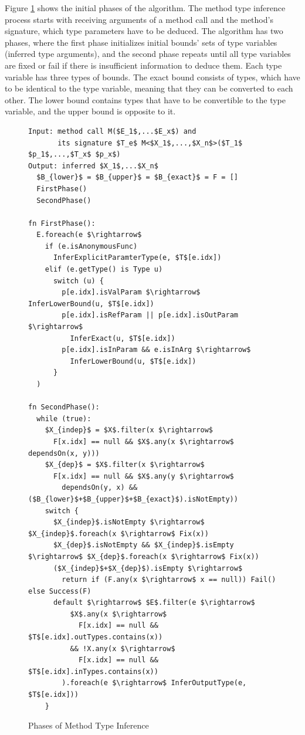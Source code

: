 Figure \ref{img10:methodTypeInference1} shows the initial phases of the algorithm. 
The method type inference process starts with receiving arguments of a method call and the method’s signature, which type parameters have to be deduced. 
The algorithm has two phases, where the first phase initializes initial bounds’ sets of type variables (inferred type arguments), and the second phase repeats until all type variables are fixed or fail if there is insufficient information to deduce them. 
Each type variable has three types of bounds. 
The exact bound consists of types, which have to be identical to the type variable, meaning that they can be converted to each other. 
The lower bound contains types that have to be convertible to the type variable, and the upper bound is opposite to it.
\begin{figure}[h!]
\begin{lstlisting}[style=myAlgo, mathescape=true]
Input: method call M($E_1$,...$E_x$) and 
       its signature $T_e$ M<$X_1$,...,$X_n$>($T_1$ $p_1$,...,$T_x$ $p_x$)
Output: inferred $X_1$,...$X_n$
  $B_{lower}$ = $B_{upper}$ = $B_{exact}$ = F = []
  FirstPhase()
  SecondPhase()

fn FirstPhase():
  E.foreach(e $\rightarrow$  
    if (e.isAnonymousFunc)
      InferExplicitParamterType(e, $T$[e.idx])
    elif (e.getType() is Type u)
      switch (u) {
        p[e.idx].isValParam $\rightarrow$ InferLowerBound(u, $T$[e.idx])
        p[e.idx].isRefParam || p[e.idx].isOutParam $\rightarrow$ 
          InferExact(u, $T$[e.idx])
        p[e.idx].isInParam && e.isInArg $\rightarrow$ 
          InferLowerBound(u, $T$[e.idx])
      }
  )
  
fn SecondPhase():
  while (true):
    $X_{indep}$ = $X$.filter(x $\rightarrow$ 
      F[x.idx] == null && $X$.any(x $\rightarrow$ dependsOn(x, y)))
    $X_{dep}$ = $X$.filter(x $\rightarrow$
      F[x.idx] == null && $X$.any(y $\rightarrow$ 
        dependsOn(y, x) && ($B_{lower}$+$B_{upper}$+$B_{exact}$).isNotEmpty))
    switch {
	  $X_{indep}$.isNotEmpty $\rightarrow$ $X_{indep}$.foreach(x $\rightarrow$ Fix(x))     
	  $X_{dep}$.isNotEmpty && $X_{indep}$.isEmpty $\rightarrow$ $X_{dep}$.foreach(x $\rightarrow$ Fix(x))
	  ($X_{indep}$+$X_{dep}$).isEmpty $\rightarrow$ 
	    return if (F.any(x $\rightarrow$ x == null)) Fail() else Success(F)
	  default $\rightarrow$ $E$.filter(e $\rightarrow$ 
	      $X$.any(x $\rightarrow$ 
	        F[x.idx] == null && $T$[e.idx].outTypes.contains(x)) 
	      && !X.any(x $\rightarrow$ 
	        F[x.idx] == null && $T$[e.idx].inTypes.contains(x))
	    ).foreach(e $\rightarrow$ InferOutputType(e, $T$[e.idx]))
    }
\end{lstlisting}
\caption{Phases of Method Type Inference}
\label{img10:methodTypeInference1}
\end{figure}
